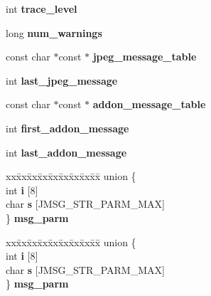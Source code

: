 \begin{DoxyCompactItemize}
\begin{tabbing}
\end{tabbing}\item 
\mbox{\label{structjpeg__error__mgr_a77328bf266cc3c3c4d9741fc27a4ef9b}} 
int {\bfseries trace\+\_\+level}
\item 
\mbox{\label{structjpeg__error__mgr_a6d74f34ca06fd61c9cc2b5818d317255}} 
long {\bfseries num\+\_\+warnings}
\item 
\mbox{\label{structjpeg__error__mgr_ab8a1fdd7c17094cc982671e2c2c51bd2}} 
const char $\ast$const  $\ast$ {\bfseries jpeg\+\_\+message\+\_\+table}
\item 
\mbox{\label{structjpeg__error__mgr_a01d4d8f17f2d2ad49e5bd981c01296b9}} 
int {\bfseries last\+\_\+jpeg\+\_\+message}
\item 
\mbox{\label{structjpeg__error__mgr_ae788c819b23f78a37e0dbc5d8aed2441}} 
const char $\ast$const  $\ast$ {\bfseries addon\+\_\+message\+\_\+table}
\item 
\mbox{\label{structjpeg__error__mgr_a35a1536b1171bb13510b5156ffa0af05}} 
int {\bfseries first\+\_\+addon\+\_\+message}
\item 
\mbox{\label{structjpeg__error__mgr_a67531ea98e366e64d5b348446d50e806}} 
int {\bfseries last\+\_\+addon\+\_\+message}
\item 
\mbox{\label{structjpeg__error__mgr_a9a812148462502dcb4859edd687b7942}} 
\begin{tabbing}
xx\=xx\=xx\=xx\=xx\=xx\=xx\=xx\=xx\=\kill
union \{\\
\>int {\bfseries i} \mbox{[}8\mbox{]}\\
\>char {\bfseries s} \mbox{[}JMSG\_STR\_PARM\_MAX\mbox{]}\\
\} {\bfseries msg\_parm}\\

\end{tabbing}\item 
\mbox{\label{structjpeg__error__mgr_a4b8618e07585634288c1de6131174170}} 
\begin{tabbing}
xx\=xx\=xx\=xx\=xx\=xx\=xx\=xx\=xx\=\kill
union \{\\
\>int {\bfseries i} \mbox{[}8\mbox{]}\\
\>char {\bfseries s} \mbox{[}JMSG\_STR\_PARM\_MAX\mbox{]}\\
\} {\bfseries msg\_parm}\\


\end{tabbing}
\end{DoxyCompactItemize}
